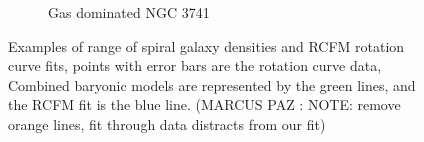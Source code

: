 \documentclass[reprint,%
 amsmath,amssymb,
 aps,
]{revtex4-1}
\begin{document}
\begin{figure}[ht]
\begin{subfigure}[c]{0.5\linewidth}
    \caption{Gas dominated NGC 3741} 
    \label{fig7:c} 
  \end{subfigure}%
  \caption{Examples of range of spiral galaxy densities and RCFM rotation curve fits, points with error bars are the rotation curve data, Combined baryonic models are represented by the green lines, and the RCFM fit is the blue line. (MARCUS PAZ : NOTE: remove orange lines, fit through data distracts from our fit)  }
  \label{fig7} 
\end{figure}
 
 
    
    
     

 
\end{document}
